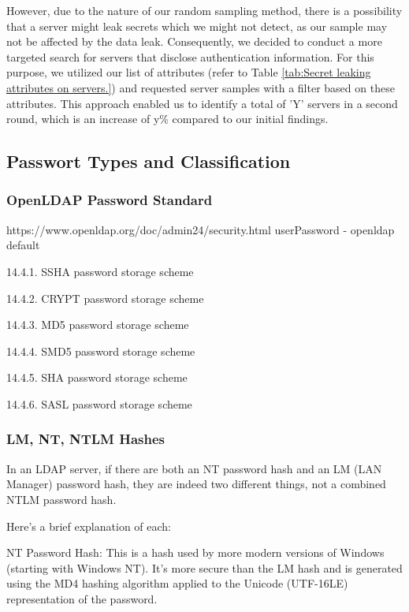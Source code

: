 
However, due to the nature of our random sampling method, there is a possibility that a server might leak secrets which we might not detect, as our sample may not be affected by the data leak. Consequently, we decided to conduct a more targeted search for servers that disclose authentication information. For this purpose, we utilized our list of attributes (refer to Table \ref{tab:Secret leaking attributes on servers.}) and requested server samples with a filter based on these attributes. This approach enabled us to identify a total of 'Y' servers in a second round, which is an increase of y\% compared to our initial findings.

\subsection{Passwort Types and Classification}

\subsubsection{OpenLDAP Password Standard}
https://www.openldap.org/doc/admin24/security.html
userPassword - openldap default

14.4.1. SSHA password storage scheme

14.4.2. CRYPT password storage scheme

14.4.3. MD5 password storage scheme

14.4.4. SMD5 password storage scheme

14.4.5. SHA password storage scheme

14.4.6. SASL password storage scheme

\subsubsection{LM, NT, NTLM Hashes}

In an LDAP server, if there are both an NT password hash and an LM (LAN Manager) password hash, they are indeed two different things, not a combined NTLM password hash.

Here's a brief explanation of each:

NT Password Hash: This is a hash used by more modern versions of Windows (starting with Windows NT). It's more secure than the LM hash and is generated using the MD4 hashing algorithm applied to the Unicode (UTF-16LE) representation of the password.

